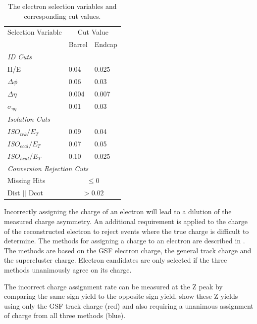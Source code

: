 \begin{table}[htbp]
  \begin{center}
    \leavevmode
    \begin{tabular}{lll} 
    \toprule
      Selection Variable & \multicolumn{2}{c}{Cut Value}\\
                         & Barrel & Endcap\\
      \midrule
      \multicolumn{3}{l}{\emph{ID Cuts}}\\ 
        H/E & 0.04 & 0.025 \\
        $\Delta\phi$ & 0.06 & 0.03 \\
        $\Delta\eta$ & 0.004 & 0.007  \\
        $\sigma_{\eta\eta}$ & 0.01 & 0.03 \\ \midrule
      \multicolumn{3}{l}{\emph{Isolation Cuts}}\\
        $ISO_{trk} / E_T $  & 0.09 & 0.04 \\
        $ISO_{ecal}/ E_T$  & 0.07 & 0.05 \\
        $ISO_{hcal}/ E_T$  & 0.10 & 0.025 \\ \midrule
      \multicolumn{3}{l}{\emph{Conversion Rejection Cuts}}\\ 
        Missing Hits  & \multicolumn{2}{c}{$\leq 0$}\\
        Dist $||$ Dcot   & \multicolumn{2}{c}{$>0.02$}\\
    \bottomrule
    \end{tabular}
    \caption{\label{tab:electronselection}The electron selection variables and corresponding cut values.}
  \end{center}
\end{table}

Incorrectly assigning the charge of an electron will lead to a dilution of the
measured charge asymmetry.  An additional requirement is applied to the charge
of the reconstructed electron to reject events where the true charge is
difficult to determine.  The methods for assigning a charge to an electron are
described in . The methods are based on the GSF electron
charge, the general track charge and the supercluster charge.
Electron candidates are only selected if the three methods unanimously agree on
its charge.

The incorrect charge assignment rate can be measured at the Z peak by comparing the same
sign \HepProcess{\PZ\to\Pepm\Pepm} yield to the opposite sign
\HepProcess{\PZ\to\Pepm\Pemp} yield.  show these Z yields
using only the \ac{GSF} track charge (red) and also requiring a unanimous
assignment of charge from all three methods (blue). 

